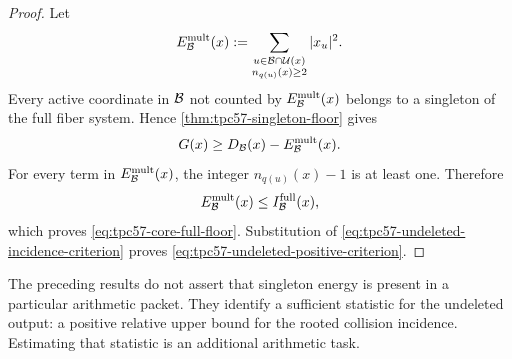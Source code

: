 \begin{proof}
Let
\[
 E_{\mathcal B}^{\rm mult}(x)
 :=\sum_{\substack{u\in\mathcal B\cap\mathcal U(x)\\n_{q(u)}(x)\ge2}}|x_u|^2.
\]
Every active coordinate in \(\mathcal B\) not counted by
\(E_{\mathcal B}^{\rm mult}(x)\) belongs to a singleton of the full fiber system.
Hence \cref{thm:tpc57-singleton-floor} gives
\[
 G(x)\ge D_{\mathcal B}(x)-E_{\mathcal B}^{\rm mult}(x).
\]
For every term in \(E_{\mathcal B}^{\rm mult}(x)\), the integer
\(n_{q(u)}(x)-1\) is at least one.  Therefore
\[
 E_{\mathcal B}^{\rm mult}(x)\le I_{\mathcal B}^{\rm full}(x),
\]
which proves \eqref{eq:tpc57-core-full-floor}.  Substitution of
\eqref{eq:tpc57-undeleted-incidence-criterion} proves
\eqref{eq:tpc57-undeleted-positive-criterion}.
\end{proof}

\begin{remark}
\label{rem:tpc57-singleton-scope}
The preceding results do not assert that singleton energy is present in a
particular arithmetic packet.  They identify a sufficient statistic for
the undeleted output: a positive relative upper bound for the rooted
collision incidence.  Estimating that statistic is an additional
arithmetic task.
\end{remark}
